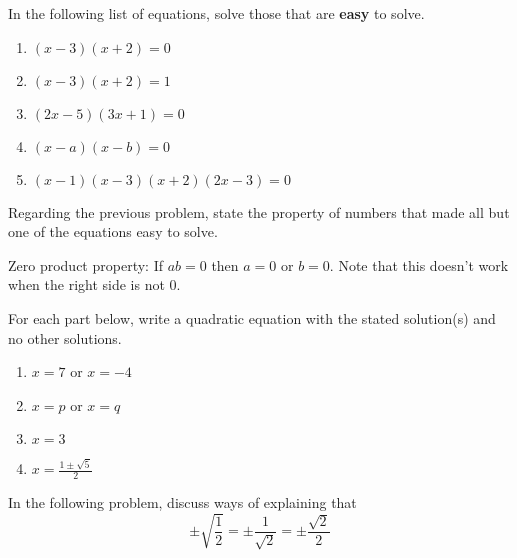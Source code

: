 \vfill

\newpage

\begin{prob}
In the following list of equations, solve those that are \textbf{easy} to solve.  
\begin{enumerate}
\item $(x-3)(x+2)=0$
\item $(x-3)(x+2)=1$
\item $(2x-5)(3x+1)=0$
\item $(x-a)(x-b)=0$
\item $(x-1)(x-3)(x+2)(2x-3)=0$
\end{enumerate}
\end{prob}

\begin{prob}
Regarding the previous problem, state the property of numbers that made all but one of the equations easy to solve.  
\end{prob}

\begin{teachingnote}
Zero product property:  If $ab = 0$ then $a=0$ or $b=0$.  Note that this doesn't work when the right side is not 0.  
\end{teachingnote}

\vspace{0.3in}



\begin{prob}For each part below, write a quadratic equation with the stated solution(s) and no other solutions.  
\begin{enumerate}
\item $x=7$ or $x=-4$
\item $x=p$ or $x=q$
\item $x=3$
\item $x=\frac{1\pm\sqrt{5}}{2}$
 \end{enumerate}
\end{prob}

\begin{teachingnote}
In the following problem, discuss ways of explaining that 
$$\pm\sqrt{\frac{1}{2}}=\pm\frac{1}{\sqrt{2}}=\pm\frac{\sqrt{2}}{2}$$
\end{teachingnote}

